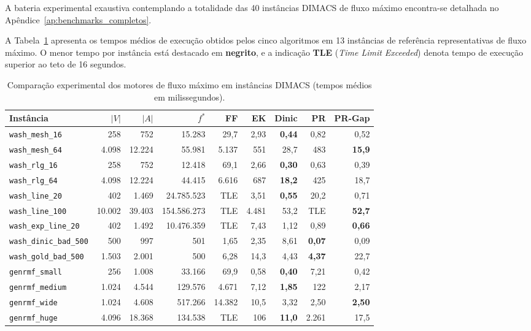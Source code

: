 \documentclass[12pt,a4paper]{article}
\begin{document}
A bateria experimental exaustiva contemplando a totalidade das 40 instâncias DIMACS de fluxo máximo encontra-se detalhada no Apêndice~\ref{ap:benchmarks_completos}.

A Tabela~\ref{tab:benchmarks_maxflow} apresenta os tempos médios de execução obtidos pelos cinco algoritmos em 13 instâncias de referência representativas de fluxo máximo. O menor tempo por instância está destacado em \textbf{negrito}, e a indicação \textbf{TLE} (\textit{Time Limit Exceeded}) denota tempo de execução superior ao teto de 16 segundos.

\begin{table}[!ht]
\centering
\small
\setlength{\tabcolsep}{3.5pt}
\begin{tabular}{lrrrrrrrr}
\toprule
\textbf{Instância} & $|V|$ & $|A|$ & $f^*$ & \textbf{FF} & \textbf{EK} & \textbf{Dinic} & \textbf{PR} & \textbf{PR-Gap} \\
\midrule
\texttt{wash\_mesh\_16} & 258 & 752 & 15.283 & 29,7 & 2,93 & \textbf{0,44} & 0,82 & 0,52 \\
\texttt{wash\_mesh\_64} & 4.098 & 12.224 & 55.981 & 5.137 & 551 & 28,7 & 483 & \textbf{15,9} \\
\texttt{wash\_rlg\_16} & 258 & 752 & 12.418 & 69,1 & 2,66 & \textbf{0,30} & 0,63 & 0,39 \\
\texttt{wash\_rlg\_64} & 4.098 & 12.224 & 44.415 & 6.616 & 687 & \textbf{18,2} & 425 & 18,7 \\
\texttt{wash\_line\_20} & 402 & 1.469 & 24.785.523 & TLE & 3,51 & \textbf{0,55} & 20,2 & 0,71 \\
\texttt{wash\_line\_100} & 10.002 & 39.403 & 154.586.273 & TLE & 4.481 & 53,2 & TLE & \textbf{52,7} \\
\texttt{wash\_exp\_line\_20} & 402 & 1.492 & 10.476.359 & TLE & 7,43 & 1,12 & 0,89 & \textbf{0,66} \\
\texttt{wash\_dinic\_bad\_500} & 500 & 997 & 501 & 1,65 & 2,35 & 8,61 & \textbf{0,07} & 0,09 \\
\texttt{wash\_gold\_bad\_500} & 1.503 & 2.001 & 500 & 6,28 & 14,3 & 4,43 & \textbf{4,37} & 22,7 \\
\texttt{genrmf\_small} & 256 & 1.008 & 33.166 & 69,9 & 0,58 & \textbf{0,40} & 7,21 & 0,42 \\
\texttt{genrmf\_medium} & 1.024 & 4.544 & 129.576 & 4.671 & 7,12 & \textbf{1,85} & 122 & 2,17 \\
\texttt{genrmf\_wide} & 1.024 & 4.608 & 517.266 & 14.382 & 10,5 & 3,32 & 2,50 & \textbf{2,50} \\
\texttt{genrmf\_huge} & 4.096 & 18.368 & 134.538 & TLE & 106 & \textbf{11,0} & 2.261 & 17,5 \\
\bottomrule
\end{tabular}
\caption{Comparação experimental dos motores de fluxo máximo em instâncias DIMACS (tempos médios em milissegundos).}
\label{tab:benchmarks_maxflow}
\end{table}
\end{document}
